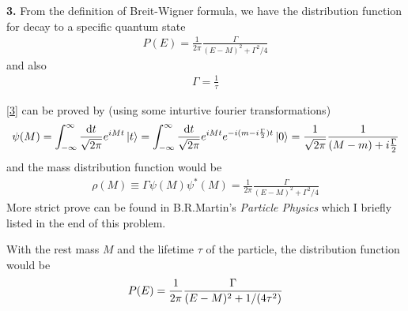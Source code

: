 \documentclass{article}
\begin{document}
{\bf3.} From the definition of Breit-Wigner formula, we have the distribution function for decay to a specific quantum state
\begin{align}\label{3}
  P(E)=\frac{1}{2\pi}\frac{\Gamma}{(E-M)^2+\Gamma^2/4}
\end{align}
and also
\begin{align*}
  \Gamma=\frac{1}{\tau}
\end{align*}

\eqref{3} can be proved by (using some inturtive fourier transformations)
\begin{align*}
  \psi(M)=\int_{-\infty}^{\infty}\frac{\dd t}{\sqrt{2\pi}}e^{iMt}\ket{t}=\int_{-\infty}^{\infty}\frac{\dd t}{\sqrt{2\pi}}e^{iMt}e^{-i(m-i\frac{\Gamma}{2})t}\ket{0}=\frac{1}{\sqrt{2\pi}}\frac{1}{(M-m)+i\frac{\Gamma}{2}}
\end{align*}
and the mass distribution function would be
\begin{align*}
  \rho(M)\equiv\Gamma\psi(M)\psi^*(M)=\frac{1}{2\pi}\frac{\Gamma}{(E-M)^2+\Gamma^2/4}
\end{align*}
More strict prove can be found in B.R.Martin's \emph{Particle Physics} which I briefly listed in the end of this problem.

With the rest mass $M$ and the lifetime $\tau$ of the particle, the distribution function would be
\begin{align}
    P(E)=\frac{1}{2\pi}\frac{\Gamma}{(E-M)^2+1/\pqty{4\tau^2}}
\end{align}
\end{document}
